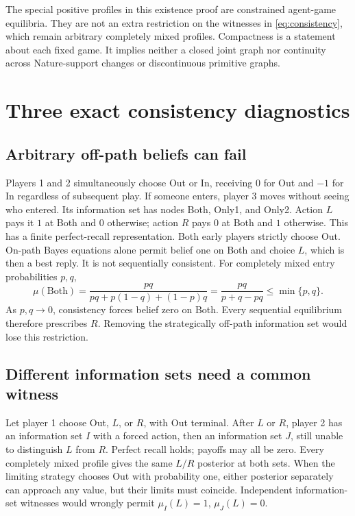 \documentclass[11pt,a4paper]{article}
\numberwithin{equation}{section}
\theoremstyle{definition}
\begin{document}
The special positive profiles in this existence proof are constrained
agent-game equilibria. They are not an extra restriction on the
witnesses in \eqref{eq:consistency}, which remain arbitrary completely
mixed profiles.
Compactness is a statement about each fixed game.
It implies neither a closed joint graph nor continuity across
Nature-support changes or discontinuous primitive graphs.

\section{Three exact consistency diagnostics}\label{sec:diagnostics}
\subsection{Arbitrary off-path beliefs can fail}
Players 1 and 2 simultaneously choose Out or In, receiving \(0\)
for Out and \(-1\) for In regardless of subsequent play.
If someone enters, player 3 moves without seeing who entered.
Its information set has nodes Both, Only1, and Only2.
Action \(L\) pays it \(1\) at Both and \(0\) otherwise; action \(R\)
pays \(0\) at Both and \(1\) otherwise.
This has a finite perfect-recall representation.
Both early players strictly choose Out.
On-path Bayes equations alone permit belief one on Both and choice
\(L\), which is then a best reply. It is not sequentially consistent.
For completely mixed entry probabilities \(p,q\),
\[
 \mu(\mathrm{Both})
 =\frac{pq}{pq+p(1-q)+(1-p)q}
 =\frac{pq}{p+q-pq}\le\min\{p,q\}.
\]
As \(p,q\to0\), consistency forces belief zero on Both.
Every sequential equilibrium therefore prescribes \(R\).
Removing the strategically off-path information set would lose this
restriction.

\subsection{Different information sets need a common witness}
Let player 1 choose Out, \(L\), or \(R\), with Out terminal.
After \(L\) or \(R\), player 2 has an information set \(I\) with a
forced action, then an information set \(J\), still unable to
distinguish \(L\) from \(R\).
Perfect recall holds; payoffs may all be zero.
Every completely mixed profile gives the same \(L/R\) posterior at
both sets. When the limiting strategy chooses Out with probability
one, either posterior separately can approach any value, but their
limits must coincide.
Independent information-set witnesses would wrongly permit
\(\mu_I(L)=1\), \(\mu_J(L)=0\).
\end{document}
